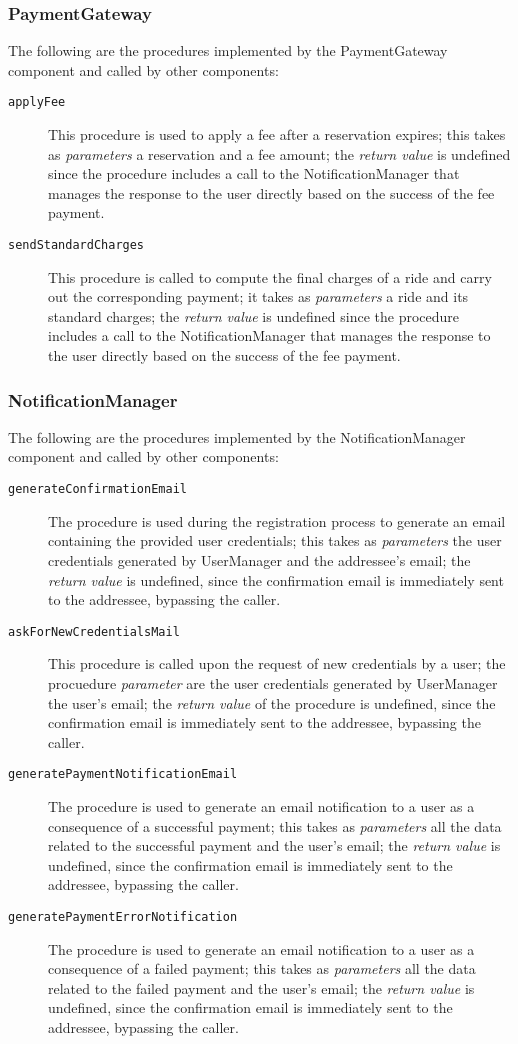 \subsubsection{PaymentGateway}
The following are the procedures implemented by the PaymentGateway component and called by other components:
\begin{description}
\item[\texttt{applyFee}] This procedure is used to apply a fee after a reservation expires; this takes as \textit{parameters} a reservation and a fee amount; the \textit{return value} is undefined since the procedure includes a call to the NotificationManager that manages the response to the user directly based on the success of the fee payment.
\item[\texttt{sendStandardCharges}] This procedure is called to compute the final charges of a ride and carry out the corresponding payment; it takes as \textit{parameters} a ride and its standard charges; the \textit{return value} is undefined since the procedure includes a call to the NotificationManager that manages the response to the user directly based on the success of the fee payment.
\end{description}
\subsubsection{NotificationManager}
The following are the procedures implemented by the NotificationManager component and called by other components:
\begin{description}
\item[\texttt{generateConfirmationEmail}] The procedure is used during the registration process to generate an email containing the provided user credentials; this takes as \textit{parameters} the user credentials generated by UserManager and the addressee's email; the \textit{return value} is undefined, since the confirmation email is immediately sent to the addressee, bypassing the caller.
\item[\texttt{askForNewCredentialsMail}] This procedure is called upon the request of new credentials by a user; the procuedure \textit{parameter} are the user credentials generated by UserManager the user's email; the \textit{return value} of the procedure is undefined, since the confirmation email is immediately sent to the addressee, bypassing the caller.
\item[\texttt{generatePaymentNotificationEmail}] The procedure is used to generate an email notification to a user as a consequence of a successful payment; this takes as \textit{parameters} all the data related to the successful payment and the user's email; the \textit{return value} is undefined, since the confirmation email is immediately sent to the addressee, bypassing the caller.
\item[\texttt{generatePaymentErrorNotification}] The procedure is used to generate an email notification to a user as a consequence of a failed payment; this takes as \textit{parameters} all the data related to the failed payment and the user's email; the \textit{return value} is undefined, since the confirmation email is immediately sent to the addressee, bypassing the caller.
\end{description}